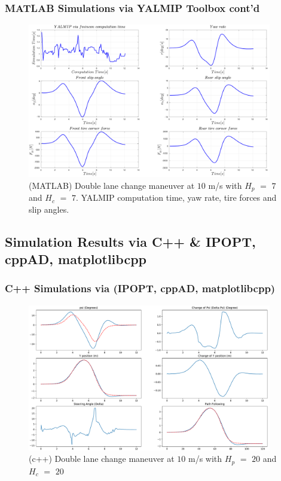 \documentclass{beamer}
\begin{document}
\begin{frame}
	\frametitle{MATLAB Simulations via YALMIP Toolbox cont'd}
	\begin{figure}
		\centering
		\includegraphics[width=0.95\textwidth,keepaspectratio]{images/Double_Lane_Change_Maneuver_MATLAB_02.pdf}
		\caption{(MATLAB) Double lane change maneuver at $10$ m/s with $H_p$ $=$ $7$ and $H_c$ $=$ $7$. YALMIP computation time, yaw rate, tire forces and slip angles.}
		\label{fig_08:double_lane_change_maneuver_02}
	\end{figure}
\end{frame}

\subsection{Simulation Results via C++ \& IPOPT, cppAD, matplotlibcpp}
\begin{frame}
	\frametitle{C++ Simulations via (IPOPT, cppAD, matplotlibcpp)}
	\begin{figure}
		\centering
		\includegraphics[width=0.95\textwidth,keepaspectratio]{images/Double_Lane_Change_Maneuver_cpp_01.pdf}
		\caption{(c++) Double lane change maneuver at $10$ m/s with $H_p$ $=$ $20$ and $H_c$ $=$ $20$}
		\label{fig_10:double_lane_change_maneuver_cpp_01}
	\end{figure}
\end{frame}
\end{document}
